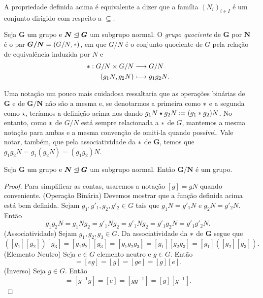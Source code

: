 A propriedade definida acima é equivalente a dizer que a família $(N_i)_{i \in I}$ é um conjunto dirigido com respeito a $\subseteq$.

\begin{defi}
Seja $\bm G$ um grupo e $\bm N \mathrel{\unlhd} \bm G$ um subgrupo normal. O \emph{grupo quociente} de $\bm G$ por $\bm N$ é o par $\bm{G/N}=(G/N,\ast)$, em que $G/N$ é o conjunto quociente de $G$ pela relação de equivalência induzida por $N$ e
	\begin{align*}
	\ast: G/N \times G/N &\longrightarrow G/N \\
		(g_1N,g_2N) &\longmapsto g_1g_2N.
	\end{align*}
\end{defi}

Uma notação um pouco mais cuidadosa ressaltaria que as operações binárias de $\bm G$ e de $\bm{G/N}$ não são a mesma e, se denotarmos a primeira como $\ast$ e a segunda como $\star$, teríamos a definição acima nos dando $g_1N \star g_2N \coloneqq (g_1 \opb g_2)N$. No entanto, como $\ast$ de $G/N$ está sempre relacionada a $\ast$ de $G$, mantemos a mesma notação para ambas e a mesma convenção de omiti-la quando possível. Vale notar, também, que pela associatividade da $\ast$ de $\bm G$, temos que $g_1g_2N=g_1(g_2N)=(g_1g_2)N$.

\begin{prop}
Seja $\bm G$ um grupo e $\bm N \mathrel{\unlhd} \bm G$ um subgrupo normal. Então $\bm{G/N}$ é um grupo.
\end{prop}
\begin{proof}
Para simplificar as contas, usaremos a notação $[g]=gN$ quando conveniente.
(Operação Binária) Devemos mostrar que a função definida acima está bem definida. Sejam $g_1,g'_1,g_2,g'_2 \in G$ tais que $g_1N=g'_1N$ e $g_2N=g'_2N$. Então
	\begin{equation*}
	g_1g_2N = g_1Ng_2 = g'_1Ng_2 = g'_1Ng_2 = g'_1g_2N=g'_1g'_2N.
	\end{equation*}
(Associatividade) Sejam $g_1,g_2,g_3 \in G$. Da associatividade da $\ast$ de $\bm G$ segue que
	\begin{equation*}
	([g_1][g_2])[g_3] = [g_1g_2][g_3] = [g_1g_2g_3] = [g_1][g_2g_3] = [g_1]([g_2] [g_3]).
	\end{equation*}
(Elemento Neutro) Seja $e \in G$ elemento neutro e $g \in G$. Então
	\begin{equation*}
	[e][g] = [eg] = [g] = [ge] = [g][e].
	\end{equation*}
(Inverso) Seja $g \in G$. Então
	\begin{equation*}
	[g^{-1}][g] = [g^{-1}g] = [e] = [gg^{-1}] = [g][g^{-1}].
	\end{equation*}
\end{proof}

